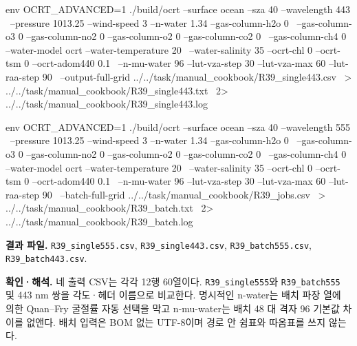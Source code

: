 \noindent\begin{minipage}{\linewidth}
\begin{ManualCode}

env OCRT_ADVANCED=1 ./build/ocrt --surface ocean --sza 40 --wavelength 443 \
  --pressure 1013.25 --wind-speed 3 --n-water 1.34 --gas-column-h2o 0 \
  --gas-column-o3 0 --gas-column-no2 0 --gas-column-o2 0 --gas-column-co2 0 \
  --gas-column-ch4 0 --water-model ocrt --water-temperature 20 \
  --water-salinity 35 --ocrt-chl 0 --ocrt-tsm 0 --ocrt-adom440 0.1 \
  --n-mu-water 96 --lut-vza-step 30 --lut-vza-max 60 --lut-raa-step 90 \
  --output-full-grid ../../task/manual_cookbook/R39_single443.csv \
  > ../../task/manual_cookbook/R39_single443.txt \
  2> ../../task/manual_cookbook/R39_single443.log

\end{ManualCode}
\end{minipage}\par

\noindent\begin{minipage}{\linewidth}
\begin{ManualCode}

env OCRT_ADVANCED=1 ./build/ocrt --surface ocean --sza 40 --wavelength 555 \
  --pressure 1013.25 --wind-speed 3 --n-water 1.34 --gas-column-h2o 0 \
  --gas-column-o3 0 --gas-column-no2 0 --gas-column-o2 0 --gas-column-co2 0 \
  --gas-column-ch4 0 --water-model ocrt --water-temperature 20 \
  --water-salinity 35 --ocrt-chl 0 --ocrt-tsm 0 --ocrt-adom440 0.1 \
  --n-mu-water 96 --lut-vza-step 30 --lut-vza-max 60 --lut-raa-step 90 \
  --batch-full-grid ../../task/manual_cookbook/R39_jobs.csv \
  > ../../task/manual_cookbook/R39_batch.txt \
  2> ../../task/manual_cookbook/R39_batch.log

\end{ManualCode}
\end{minipage}\par

\textbf{결과 파일. }\texttt{R39\_\allowbreak{}single555.csv}, \texttt{R39\_\allowbreak{}single443.csv}, \texttt{R39\_\allowbreak{}batch555.csv}, \texttt{R39\_\allowbreak{}batch443.csv}.

\textbf{확인·해석. }네 출력 CSV는 각각 12행 60열이다. \texttt{R39\_\allowbreak{}single555}와 \texttt{R39\_\allowbreak{}batch555} 및 443 nm 쌍을 각도·헤더 이름으로 비교한다. 명시적인 n-water는 배치 파장 열에 의한 Quan–Fry 굴절률 자동 선택을 막고 n-mu-water는 배치 48 대 격자 96 기본값 차이를 없앤다. 배치 입력은 BOM 없는 UTF-8이며 경로 안 쉼표와 따옴표를 쓰지 않는다.

